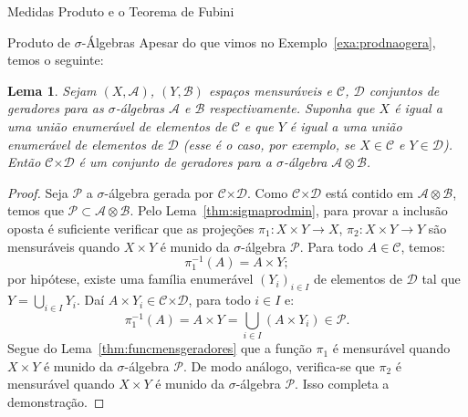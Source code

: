 \documentclass[oneside,final,11pt]{amsbook}
\newcommand{\Times}{\pmb{\times}}
\theoremstyle{remark}\newtheorem{exercise}{Exercício}[chapter]
\theoremstyle{remark}\newtheorem{*exercise}[exercise]{\hbox to 0pt{\hskip 0pt minus 1fil*}Exercício}
\theoremstyle{definition}\newtheorem{exdefin}{Definição}[chapter]
\theoremstyle{plain}\newtheorem{teo}{Teorema}[section]
\theoremstyle{plain}\newtheorem{lem}[teo]{Lema}
\theoremstyle{plain}\newtheorem{prop}[teo]{Proposição}
\theoremstyle{plain}\newtheorem{cor}[teo]{Corolário}
\theoremstyle{definition}\newtheorem{defin}[teo]{Definição}
\theoremstyle{remark}\newtheorem{rem}[teo]{Observação}
\theoremstyle{definition}\newtheorem{notation}[teo]{Notação}
\theoremstyle{definition}\newtheorem{convention}[teo]{Convenção}
\theoremstyle{definition}\newtheorem{example}[teo]{Exemplo}
\numberwithin{section}{chapter}
\numberwithin{equation}{section}
\begin{document}
\begin{chapter}{Medidas Produto e o Teorema de Fubini}
\begin{section}{Produto de ${\sigma}$-Álgebras}
Apesar do que vimos no Exemplo~\ref{exa:prodnaogera}, temos o seguinte:
\begin{lem}\label{thm:prodgeradores}
Sejam $(X,\mathcal A)$, $(Y,\mathcal B)$ espaços mensuráveis e $\mathcal C$, $\mathcal D$
conjuntos de geradores para as $\sigma$-álgebras $\mathcal A$ e $\mathcal B$ respectivamente. Suponha que
$X$ é igual a uma união enumerável de elementos de $\mathcal C$ e que $Y$ é igual
a uma união enumerável de elementos de $\mathcal D$ (esse é o caso, por exemplo,
se $X\in\mathcal C$ e $Y\in\mathcal D$). Então $\mathcal C\Times\mathcal D$ é um conjunto
de geradores para a $\sigma$-álgebra $\mathcal A\otimes\mathcal B$.
\end{lem}
\begin{proof}
Seja $\mathcal P$ a $\sigma$-álgebra gerada por $\mathcal C\Times\mathcal D$. Como
$\mathcal C\Times\mathcal D$ está contido em $\mathcal A\otimes\mathcal B$, temos que
$\mathcal P\subset\mathcal A\otimes\mathcal B$. Pelo Lema~\ref{thm:sigmaprodmin}, para provar a inclusão
oposta é suficiente verificar que as projeções $\pi_1:X\times Y\to X$, $\pi_2:X\times Y\to Y$
são mensuráveis quando $X\times Y$ é munido da $\sigma$-álgebra $\mathcal P$.
Para todo $A\in\mathcal C$, temos:
\[\pi_1^{-1}(A)=A\times Y;\]
por hipótese, existe uma família enumerável $(Y_i)_{i\in I}$ de elementos de $\mathcal D$
tal que $Y=\bigcup_{i\in I}Y_i$. Daí $A\times Y_i\in\mathcal C\Times\mathcal D$, para
todo $i\in I$ e:
\[\pi_1^{-1}(A)=A\times Y=\bigcup_{i\in I}(A\times Y_i)\in\mathcal P.\]
Segue do Lema~\ref{thm:funcmensgeradores} que a função $\pi_1$ é mensurável quando $X\times Y$
é munido da $\sigma$-álgebra $\mathcal P$. De modo análogo, verifica-se que
$\pi_2$ é mensurável quando $X\times Y$ é munido da $\sigma$-álgebra $\mathcal P$.
Isso completa a demonstração.
\end{proof}


\end{section}
\end{chapter}
\end{document}
